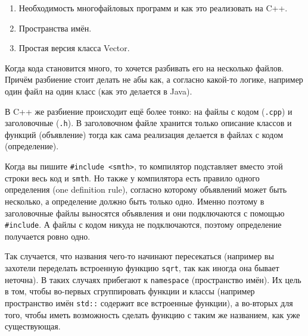 \label{md2tex2}
\hyperref[md2texREADME]{\color{cyan}{К главному описанию}}


\begin{enumerate}
    \item Необходимость многофайловых программ и как это реализовать на C++.
    \item Пространства имён.
    \item Простая версия класса Vector.
\end{enumerate}


Когда кода становится много, то хочется разбивать его на несколько файлов. Причём разбиение стоит делать не абы как, а согласно какой-то логике, например один файл на один класс (как это делается в Java).

В C++ же разбиение происходит ещё более тонко: на файлы с кодом (\texttt{.cpp}) и заголовочные (\texttt{.h}). В заголовочном файле хранится только описание классов и функций (объявление) тогда как сама реализация делается в файлах с кодом (определение).

Когда вы пишите \texttt{#include <smth>}, то компилятор подставляет вместо этой строки весь код и \texttt{smth}. Но также у компилятора есть правило одного определения (one definition rule), согласно которому объявлений может быть несколько, а определение должно быть только одно. Именно поэтому в заголовочные файлы выносятся объявления и они подключаются с помощью \texttt{#include}. А файлы с кодом никуда не подключаются, поэтому определение получается ровно одно.


Так случается, что названия чего-то начинают пересекаться (например вы захотели переделать встроенную функцию \texttt{sqrt}, так как иногда она бывает неточна). В таких случаях прибегают к \texttt{namespace} (пространство имён). Их цель в том, чтобы во-первых сгруппировать функции и классы (например пространство имён \texttt{std::} содержит все встроенные функции), а во-вторых для того, чтобы иметь возможность сделать функцию с таким же названием, как уже существующая.


